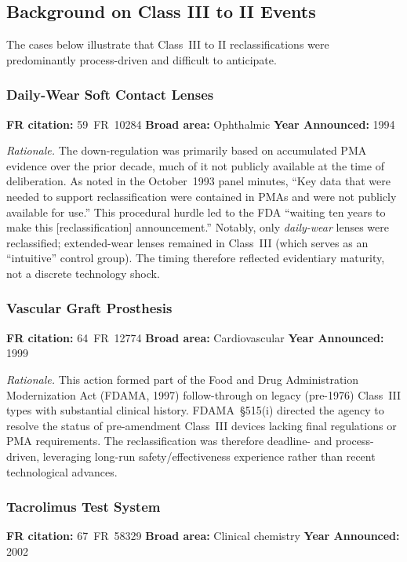 \documentclass[letterpaper,12pt]{article}
\theoremstyle{definition}
\begin{document}
\subsection{Background on Class III to II Events}\label{sec:BackgroundIIItoII}

The cases below illustrate that Class~III to II reclassifications were predominantly process-driven and difficult to anticipate.



\subsubsection*{Daily-Wear Soft Contact Lenses}
\textbf{FR citation:} 59~FR~10284 \quad \textbf{Broad area:} Ophthalmic \quad \textbf{Year Announced:} 1994


\textit{Rationale.} The down-regulation was primarily based on accumulated PMA evidence over the prior decade, much of it not publicly available at the time of deliberation. As noted in the October~1993 panel minutes, ``Key data that were needed to support reclassification were contained in PMAs and were not publicly available for use.'' This procedural hurdle led to the FDA ``waiting ten years to make this [reclassification] announcement.'' Notably, only \emph{daily-wear} lenses were reclassified; extended-wear lenses remained in Class~III (which serves as an ``intuitive'' control group). The timing therefore reflected evidentiary maturity, not a discrete technology shock.




\subsubsection*{Vascular Graft Prosthesis}
\textbf{FR citation:} 64~FR~12774 \quad \textbf{Broad area:} Cardiovascular \quad \textbf{Year Announced:} 1999 


\textit{Rationale.} This action formed part of the Food and Drug Administration Modernization Act (FDAMA, 1997) follow-through on legacy (pre-1976) Class~III types with substantial clinical history. FDAMA~\S515(i) directed the agency to resolve the status of pre-amendment Class~III devices lacking final regulations or PMA requirements. The reclassification was therefore deadline- and process-driven, leveraging long-run safety/effectiveness experience rather than recent technological advances.





\subsubsection*{Tacrolimus Test System}
\textbf{FR citation:} 67~FR~58329 \quad \textbf{Broad area:} Clinical chemistry \quad \textbf{Year Announced:} 2002
\end{document}
